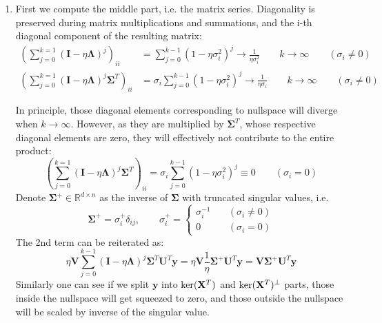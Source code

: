 \documentclass[a4paper, 10pt]{article}
\begin{document}
\begin{enumerate}[label=(\alph*)]
    \item First we compute the middle part, i.e. the matrix series. Diagonality is preserved during matrix multiplications and summations, and the i-th diagonal component of the resulting matrix:
    \begin{equation}
        \begin{aligned}
            \left(\sum_{j=0}^{k=1}\left(\mathbf{I} - \eta \bm{\Lambda}\right)^j\right)_{ii} &= \sum_{j=0}^{k-1} (1- \eta \sigma_i^2)^j \rightarrow \frac{1}{\eta \sigma_i^2}\qquad k\rightarrow \infty\qquad (\sigma_i\neq 0) \\ 
            \left(\sum_{j=0}^{k=1}\left(\mathbf{I} - \eta \bm{\Lambda}\right)^j \bm{\Sigma}^T\right)_{ii} &= \sigma_i \sum_{j=0}^{k-1} (1- \eta \sigma_i^2)^j \rightarrow \frac{1}{\eta \sigma_i}\qquad k\rightarrow \infty\qquad (\sigma_i\neq 0)
        \end{aligned}
    \end{equation}
    
    In principle, those diagonal elements corresponding to nullspace will diverge when $k\rightarrow \infty$. However, as they are multiplied by $\bm{\Sigma}^T$, whose respective diagonal elements are zero, they will effectively not contribute to the entire product:
    \begin{equation}
        \left(\sum_{j=0}^{k=1}\left(\mathbf{I} - \eta \bm{\Lambda}\right)^j \bm{\Sigma}^T\right)_{ii} = \sigma_i \sum_{j=0}^{k-1} (1- \eta \sigma_i^2)^j \equiv 0 \qquad (\sigma_i = 0)
    \end{equation}
    Denote $\bm{\Sigma}^+ \in \mathbb{R}^{d\times n}$ as the inverse of $\bm{\Sigma}$ with truncated singular values, i.e. 
    \begin{equation}
        \bm{\Sigma}^+ = \sigma_i^+ \delta_{ij},\qquad \sigma_i^+ = \left\{\begin{aligned}
            \sigma_i^{-1}&\quad (\sigma_i\neq 0) \\ 
            0&\quad (\sigma_i = 0)
        \end{aligned}
        \right.
    \end{equation}
    The 2nd term can be reiterated as:
    \begin{equation}
        \eta \mathbf{V} \sum_{j=0}^{k-1} \left(\mathbf{I} - \eta \bm{\Lambda}\right)^j \bm{\Sigma}^T \mathbf{U}^T \mathbf{y} = \eta \mathbf{V} \frac{1}{\eta} \bm{\Sigma}^+ \mathbf{U}^T \mathbf{y} = \mathbf{V} \bm{\Sigma}^+ \mathbf{U}^T \mathbf{y}
    \end{equation}
    Similarly one can see if we split $\mathbf{y}$ into ${\rm ker}(\mathbf{X}^T)$ and ${\rm ker}(\mathbf{X}^T)^\perp$ parts, those inside the nullspace will get squeezed to zero, and those outside the nullspace will be scaled by inverse of the singular value.
    

\end{enumerate}
\end{document}
